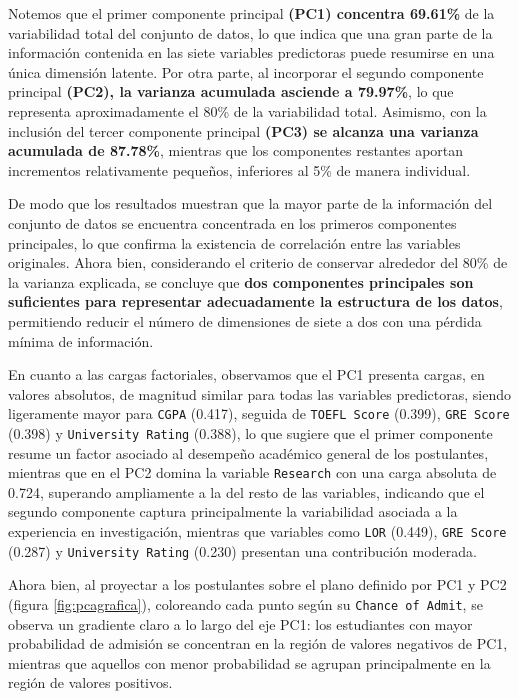 \documentclass[
  10pt,
  a4paper]{article}
\begin{document}
Notemos que el primer componente principal \textbf{(PC1) concentra 69.61\%} de la variabilidad total del conjunto de datos, lo que indica que una gran parte de la información contenida en las siete variables predictoras puede resumirse en una única dimensión latente. Por otra parte, al incorporar el segundo componente principal \textbf{(PC2), la varianza acumulada asciende a 79.97\%}, lo que representa aproximadamente el 80\% de la variabilidad total. Asimismo, con la inclusión del tercer componente principal \textbf{(PC3) se alcanza una varianza acumulada de 87.78\%}, mientras que los componentes restantes aportan incrementos relativamente pequeños, inferiores al 5\% de manera individual.

De modo que los resultados muestran que la mayor parte de la información del conjunto de datos se encuentra concentrada en los primeros componentes principales, lo que confirma la existencia de correlación entre las variables originales. Ahora bien, considerando el criterio de conservar alrededor del 80\% de la varianza explicada, se concluye que \textbf{dos componentes principales son suficientes para representar adecuadamente la estructura de los datos}, permitiendo reducir el número de dimensiones de siete a dos con una pérdida mínima de información.

En cuanto a las cargas factoriales, observamos que el PC1 presenta cargas, en valores absolutos, de magnitud similar para todas las variables predictoras, siendo ligeramente mayor para \texttt{CGPA} (0.417), seguida de \texttt{TOEFL\ Score} (0.399), \texttt{GRE\ Score} (0.398) y \texttt{University\ Rating} (0.388), lo que sugiere que el primer componente resume un factor asociado al desempeño académico general de los postulantes, mientras que en el PC2 domina la variable \texttt{Research} con una carga absoluta de 0.724, superando ampliamente a la del resto de las variables, indicando que el segundo componente captura principalmente la variabilidad asociada a la experiencia en investigación, mientras que variables como \texttt{LOR} (0.449), \texttt{GRE\ Score} (0.287) y \texttt{University\ Rating} (0.230) presentan una contribución moderada.

Ahora bien, al proyectar a los postulantes sobre el plano definido por PC1 y PC2 (figura \ref{fig:pcagrafica}), coloreando cada punto según su \texttt{Chance\ of\ Admit}, se observa un gradiente claro a lo largo del eje PC1: los estudiantes con mayor probabilidad de admisión se concentran en la región de valores negativos de PC1, mientras que aquellos con menor probabilidad se agrupan principalmente en la región de valores positivos.
\end{document}
